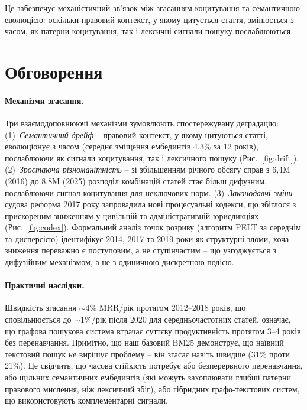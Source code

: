 Це забезпечує механістичний зв'язок між згасанням коцитування та семантичною еволюцією: оскільки правовий контекст, у якому цитується стаття, змінюється з часом, як патерни коцитування, так і лексичні сигнали пошуку послаблюються.

\section{Обговорення}
\label{sec:discussion}

\paragraph{Механізми згасання.}
Три взаємодоповнюючі механізми зумовлюють спостережувану деградацію:
(1)~\emph{Семантичний дрейф} -- правовий контекст, у якому цитуються статті, еволюціонує з часом (середнє зміщення ембедингів 4{,}3\% за 12 років), послаблюючи як сигнали коцитування, так і лексичного пошуку (Рис.~\ref{fig:drift}).
(2)~\emph{Зростаюча різноманітність} -- зі збільшенням річного обсягу справ з 6{,}4M (2016) до 8{,}8M (2025) розподіл комбінацій статей стає більш дифузним, послаблюючи сигнал коцитування для неключових норм.
(3)~\emph{Законодавчі зміни} -- судова реформа 2017 року запровадила нові процесуальні кодекси, що збіглося з прискореним зниженням у цивільній та адміністративній юрисдикціях (Рис.~\ref{fig:codex}).
Формальний аналіз точок розриву (алгоритм PELT за середнім та дисперсією) ідентифікує 2014, 2017 та 2019 роки як структурні зломи, хоча зниження переважно є поступовим, а не ступінчастим -- що узгоджується з дифузійним механізмом, а не з одиничною дискретною подією.

\paragraph{Практичні наслідки.}
Швидкість згасання $\sim$4\% MRR/рік протягом 2012--2018 років, що сповільнюється до $\sim$1\%/рік після 2020 для середньочастотних статей, означає, що графова пошукова система втрачає суттєву продуктивність протягом 3--4 років без перенавчання.
Примітно, що наш базовий BM25 демонструє, що наївний текстовий пошук \emph{не} вирішує проблему -- він згасає навіть швидше (31\% проти 21\%).
Це свідчить, що часова стійкість потребує або безперервного перенавчання, або щільних семантичних ембедингів (які можуть захоплювати глибші патерни правового мислення, ніж лексичний збіг), або гібридних графо-текстових систем, що використовують комплементарні сигнали.


